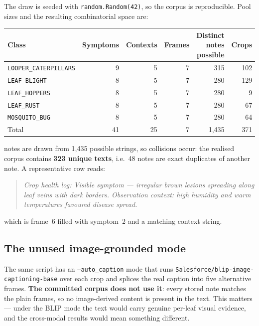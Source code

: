 \documentclass[11pt,a4paper]{article}
\newcommand{\code}[1]{\texttt{\small #1}}
\begin{document}
\noindent
The draw is seeded with \code{random.Random(42)}, so the corpus is reproducible.
Pool sizes and the resulting combinatorial space are:

\begin{center}
\small
\begin{tabular}{@{}lrrrrr@{}}
\toprule
Class & Symptoms & Contexts & Frames & Distinct notes possible & Crops \\
\midrule
\code{LOOPER\_CATERPILLARS} & 9 & 5 & 7 & 315 & 102\\
\code{LEAF\_BLIGHT}         & 8 & 5 & 7 & 280 & 129\\
\code{LEAF\_HOPPERS}        & 8 & 5 & 7 & 280 & 9\\
\code{LEAF\_RUST}           & 8 & 5 & 7 & 280 & 67\\
\code{MOSQUITO\_BUG}        & 8 & 5 & 7 & 280 & 64\\
\midrule
Total & 41 & 25 & 7 & 1{,}435 & 371\\
\bottomrule
\end{tabular}
\end{center}

 notes are drawn from 1{,}435 possible strings, so collisions occur: the
realised corpus contains \textbf{323 unique texts}, i.e.\ 48 notes are exact
duplicates of another note. A representative row reads:

\begin{quote}\small
\emph{Crop health log: Visible symptom --- irregular brown lesions spreading
along leaf veins with dark borders. Observation context: high humidity and warm
temperatures favoured disease spread.}
\end{quote}

\noindent
which is frame~6 filled with symptom~2 and a matching context string.

\subsection{The unused image-grounded mode}

The same script has an \code{--auto\_caption} mode that runs
\code{Salesforce/blip-image-captioning-base} over each crop and splices the real
caption into five alternative frames. \textbf{The committed corpus does not use
it}: every stored note matches the plain frames, so no image-derived content is
present in the text. This matters --- under the BLIP mode the text would carry
genuine per-leaf visual evidence, and the cross-modal results would mean
something different.
\end{document}
